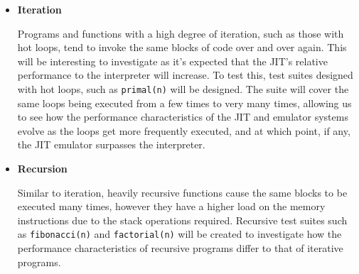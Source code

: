 \begin{itemize}
    \item \textbf{Iteration}
    
    Programs and functions with a high degree of iteration, such as those with hot loops, tend to invoke the same blocks of code over and over again. This will be interesting to investigate as it's expected that the JIT's relative performance to the interpreter will increase. To test this, test suites designed with hot loops, such as \texttt{primal(n)} will be designed. The suite will cover the same loops being executed from a few times to very many times, allowing us to see how the performance characteristics of the JIT and emulator systems evolve as the loops get more frequently executed, and at which point, if any, the JIT emulator surpasses the interpreter.

    \item \textbf{Recursion}
    
    Similar to iteration, heavily recursive functions cause the same blocks to be executed many times, however they have a higher load on the memory instructions due to the stack operations required. Recursive test suites such as \texttt{fibonacci(n)} and \texttt{factorial(n)} will be created to investigate how the performance characteristics of recursive programs differ to that of iterative programs.
\end{itemize}
